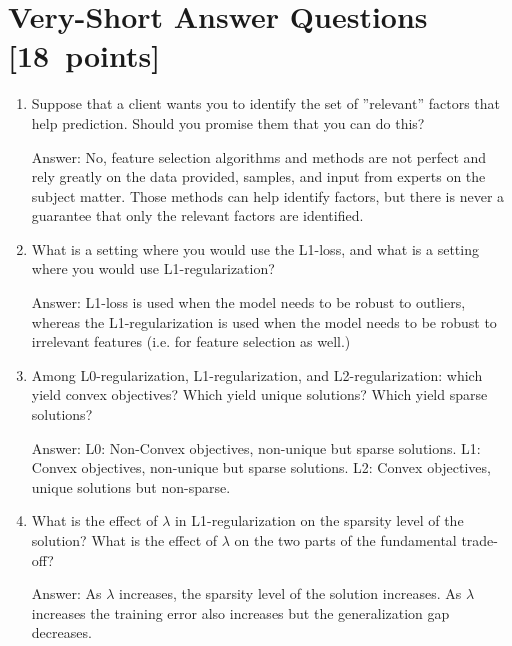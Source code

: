 \documentclass{article}
\newcommand{\gre}[1]{\textcolor{gre}{#1}}
\newcommand\ans[1]{\par\gre{Answer: #1}}
\newcommand\pts[1]{\textcolor{pointscolour}{[#1~points]}}
\begin{document}
\section{Very-Short Answer Questions \pts{18}}
\begin{enumerate}

\item Suppose that a client wants you to identify the set of ''relevant'' factors that help prediction. Should you promise them that you can do this?
\ans{No, feature selection algorithms and methods are not perfect and rely greatly on the data provided, samples, and input from experts on the subject matter. Those methods can help identify factors, but there is never a guarantee that only the relevant factors are identified.}

\item What is a setting where you would use the L1-loss, and what is a setting where you would use L1-regularization?
\ans{L1-loss is used when the model needs to be robust to outliers, whereas the L1-regularization is used when the model needs to be robust to irrelevant features (i.e. for feature selection as well.)}

\item Among L0-regularization, L1-regularization, and L2-regularization: which yield convex objectives? Which yield unique solutions? Which yield sparse solutions?
\ans{L0: Non-Convex objectives, non-unique but sparse solutions. \newline L1: Convex objectives, non-unique but sparse solutions. \newline L2: Convex objectives, unique solutions but non-sparse.}

\item What is the effect of $\lambda$ in L1-regularization on the sparsity level of the solution? What is the effect of $\lambda$ on the two parts of the fundamental trade-off?
\ans{As $\lambda$ increases, the sparsity level of the solution increases. As $\lambda$ increases the training error also increases but the generalization gap decreases.}


\end{enumerate}
\end{document}
